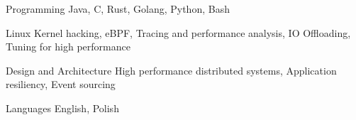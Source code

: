 

\begin{cvskills}

  \cvskill
    {Programming} %
    {Java, C, Rust, Golang, Python, Bash} %

  \cvskill
    {Linux} %
    {Kernel hacking, eBPF, Tracing and performance analysis, IO Offloading, Tuning for high performance} %

  \cvskill
    {Design and Architecture} %
    {High performance distributed systems, Application resiliency, Event sourcing} %

  \cvskill
    {Languages} %
    {English, Polish} %

\end{cvskills}
